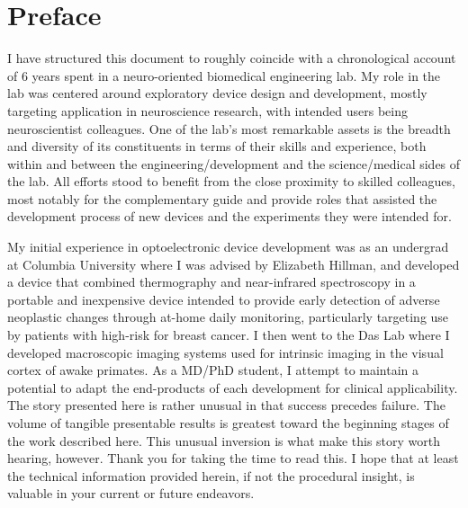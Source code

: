 \chapter*{Preface}\label{preface}

I have structured this document to roughly coincide with a chronological account of 6 years spent in a neuro-oriented biomedical engineering lab.
My role in the lab was centered around exploratory device design and development, mostly targeting application in neuroscience research, with intended users being neuroscientist colleagues.
One of the lab's most remarkable assets is the breadth and diversity of its constituents in terms of their skills and experience, both within and between the engineering/development and the science/medical sides of the lab.
All efforts stood to benefit from the close proximity to skilled colleagues, most notably for the complementary guide and provide roles that assisted the development process of new devices and the experiments they were intended for.

My initial experience in optoelectronic device development was as an undergrad at Columbia University where I was advised by Elizabeth Hillman, and developed a device that combined thermography and near-infrared spectroscopy in a portable and inexpensive device intended to provide early detection of adverse neoplastic changes through at-home daily monitoring, particularly targeting use by patients with high-risk for breast cancer.
I then went to the Das Lab where I developed macroscopic imaging systems used for intrinsic imaging in the visual cortex of awake primates.
As a MD/PhD student, I attempt to maintain a potential to adapt the end-products of each development for clinical applicability.
The story presented here is rather unusual in that success precedes failure.
The volume of tangible presentable results is greatest toward the beginning stages of the work described here.
This unusual inversion is what make this story worth hearing, however.
Thank you for taking the time to read this.
I hope that at least the technical information provided herein, if not the procedural insight, is valuable in your current or future endeavors.
